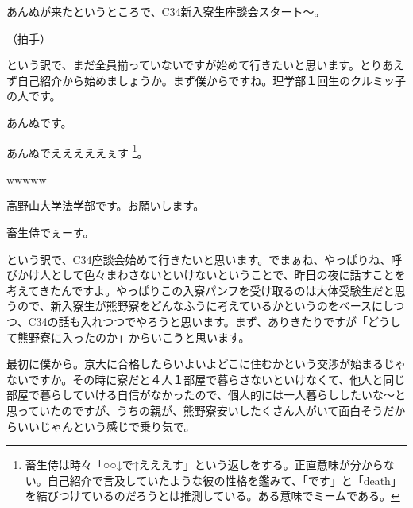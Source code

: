 \begin{multicols}{2}

\subsecnomaru{\LARGE\underline{\bf{}}}%
\subsecnomaru{\LARGE\underline{\bf{}}}
\subsecnomaru{\LARGE\underline{\bf{}}}
\subsecnomaru{\LARGE\underline{\bf{}}}
\vspace{3mm}

あんぬが来たというところで、C34新入寮生座談会スタート～。

  
（拍手）

  
という訳で、まだ全員揃っていないですが始めて行きたいと思います。とりあえず自己紹介から始めましょうか。まず僕からですね。理学部１回生のクルミッ子の人です。

  
あんぬです。

  
あんぬでえええええぇす \footnote{畜生侍は時々「○○↓で↑えええす」という返しをする。正直意味が分からない。自己紹介で言及していたような彼の性格を鑑みて、「です」と「death」を結びつけているのだろうとは推測している。ある意味でミームである。}。

  
wwwww

  
高野山大学法学部です。お願いします。

  
畜生侍でぇーす。

  
という訳で、C34座談会始めて行きたいと思います。でまぁね、やっぱりね、呼びかけ人として色々まわさないといけないということで、昨日の夜に話すことを考えてきたんですよ。やっぱりこの入寮パンフを受け取るのは大体受験生だと思うので、新入寮生が熊野寮をどんなふうに考えているかというのをベースにしつつ、C34の話も入れつつでやろうと思います。まず、ありきたりですが「どうして熊野寮に入ったのか」からいこうと思います。



\vspace{15mm}
\vspace{3mm}

最初に僕から。京大に合格したらいよいよどこに住むかという交渉が始まるじゃないですか。その時に寮だと４人１部屋で暮らさないといけなくて、他人と同じ部屋で暮らしていける自信がなかったので、個人的には一人暮らししたいな～と思っていたのですが、うちの親が、熊野寮安いしたくさん人がいて面白そうだからいいじゃんという感じで乗り気で。


\end{multicols}
